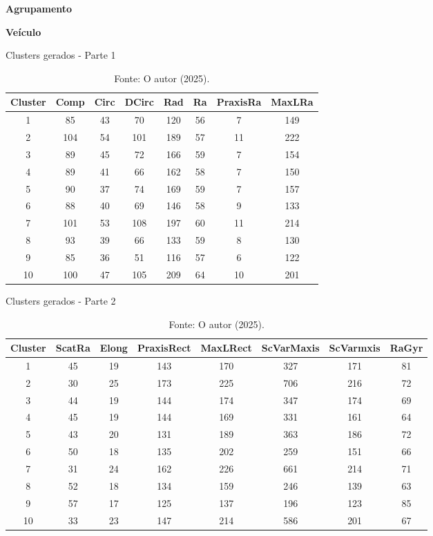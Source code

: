 \begin{adjustwidth}{1em}{}
\textbf{Agrupamento}
\end{adjustwidth}

\begin{center}
    \textbf{Veículo}
\end{center}

\begin{table}[H]
\centering
\caption{Clusters gerados - Parte 1}
\begin{tabular}{|c|c|c|c|c|c|c|c|}
\hline
Cluster & Comp & Circ & DCirc & Rad & Ra & PraxisRa & MaxLRa \\ \hline
1  & 85  & 43  & 70  & 120 & 56 & 7  & 149 \\ \hline
2  & 104 & 54  & 101 & 189 & 57 & 11 & 222 \\ \hline
3  & 89  & 45  & 72  & 166 & 59 & 7  & 154 \\ \hline
4  & 89  & 41  & 66  & 162 & 58 & 7  & 150 \\ \hline
5  & 90  & 37  & 74  & 169 & 59 & 7  & 157 \\ \hline
6  & 88  & 40  & 69  & 146 & 58 & 9  & 133 \\ \hline
7  & 101 & 53  & 108 & 197 & 60 & 11 & 214 \\ \hline
8  & 93  & 39  & 66  & 133 & 59 & 8  & 130 \\ \hline
9  & 85  & 36  & 51  & 116 & 57 & 6  & 122 \\ \hline
10 & 100 & 47  & 105 & 209 & 64 & 10 & 201 \\ \hline
\end{tabular}
\caption*{Fonte: O autor (2025).}
\end{table}

\begin{table}[H]
\centering
\caption{Clusters gerados - Parte 2}
\begin{tabular}{|c|c|c|c|c|c|c|c|}
\hline
Cluster & ScatRa & Elong & PraxisRect & MaxLRect & ScVarMaxis & ScVarmxis & RaGyr \\ \hline
1  & 45 & 19 & 143 & 170 & 327 & 171 & 81 \\ \hline
2  & 30 & 25 & 173 & 225 & 706 & 216 & 72 \\ \hline
3  & 44 & 19 & 144 & 174 & 347 & 174 & 69 \\ \hline
4  & 45 & 19 & 144 & 169 & 331 & 161 & 64 \\ \hline
5  & 43 & 20 & 131 & 189 & 363 & 186 & 72 \\ \hline
6  & 50 & 18 & 135 & 202 & 259 & 151 & 66 \\ \hline
7  & 31 & 24 & 162 & 226 & 661 & 214 & 71 \\ \hline
8  & 52 & 18 & 134 & 159 & 246 & 139 & 63 \\ \hline
9  & 57 & 17 & 125 & 137 & 196 & 123 & 85 \\ \hline
10 & 33 & 23 & 147 & 214 & 586 & 201 & 67 \\ \hline
\end{tabular}
\caption*{Fonte: O autor (2025).}
\end{table}

